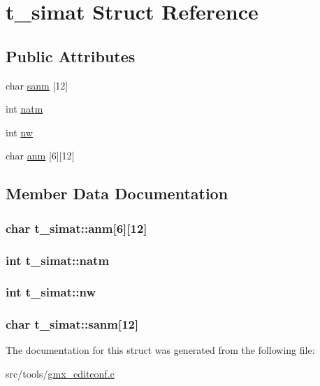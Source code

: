 \hypertarget{structt__simat}{\section{t\-\_\-simat \-Struct \-Reference}
\label{structt__simat}
}
\subsection*{\-Public \-Attributes}
\begin{DoxyCompactItemize}
\item 
char \hyperlink{structt__simat_a4cdb917679fbd654188e00f4a22efde6}{sanm} \mbox{[}12\mbox{]}
\item 
int \hyperlink{structt__simat_a3dc7b5c5f97668374d4c43595ee5c282}{natm}
\item 
int \hyperlink{structt__simat_a8113149907fd8dccb7b1a7c3984f0d59}{nw}
\item 
char \hyperlink{structt__simat_af72973a2bc6181a948dc33092cb3b0d9}{anm} \mbox{[}6\mbox{]}\mbox{[}12\mbox{]}
\end{DoxyCompactItemize}


\subsection{\-Member \-Data \-Documentation}
\hypertarget{structt__simat_af72973a2bc6181a948dc33092cb3b0d9}{
\subsubsection[{anm}]{\setlength{\rightskip}{0pt plus 5cm}char {\bf t\-\_\-simat\-::anm}\mbox{[}6\mbox{]}\mbox{[}12\mbox{]}}}\label{structt__simat_af72973a2bc6181a948dc33092cb3b0d9}
\hypertarget{structt__simat_a3dc7b5c5f97668374d4c43595ee5c282}{
\subsubsection[{natm}]{\setlength{\rightskip}{0pt plus 5cm}int {\bf t\-\_\-simat\-::natm}}}\label{structt__simat_a3dc7b5c5f97668374d4c43595ee5c282}
\hypertarget{structt__simat_a8113149907fd8dccb7b1a7c3984f0d59}{
\subsubsection[{nw}]{\setlength{\rightskip}{0pt plus 5cm}int {\bf t\-\_\-simat\-::nw}}}\label{structt__simat_a8113149907fd8dccb7b1a7c3984f0d59}
\hypertarget{structt__simat_a4cdb917679fbd654188e00f4a22efde6}{
\subsubsection[{sanm}]{\setlength{\rightskip}{0pt plus 5cm}char {\bf t\-\_\-simat\-::sanm}\mbox{[}12\mbox{]}}}\label{structt__simat_a4cdb917679fbd654188e00f4a22efde6}


\-The documentation for this struct was generated from the following file\-:\begin{DoxyCompactItemize}
\item 
src/tools/\hyperlink{gmx__editconf_8c}{gmx\-\_\-editconf.\-c}\end{DoxyCompactItemize}
